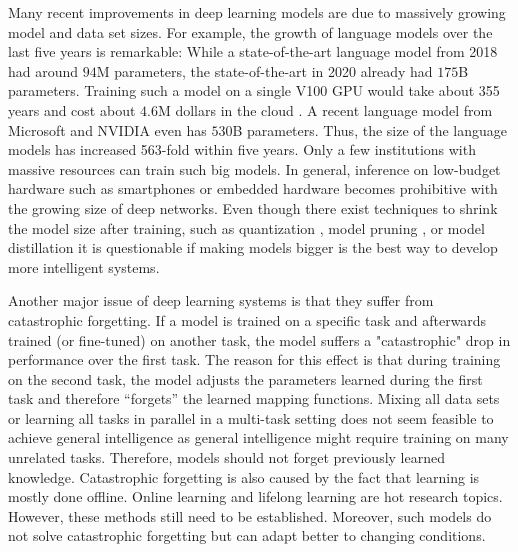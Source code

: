 Many recent improvements in deep learning models are due to massively growing model and data set sizes.
For example, the growth of language models over the last five years is remarkable:
While a state-of-the-art language model from 2018  had around \(94\)M parameters, the state-of-the-art in 2020  already had \(175\)B parameters. Training such a model on a single V100 GPU would take about 355 years and cost about \(4.6\)M dollars in the cloud .
A recent language model from Microsoft and NVIDIA  even has \(530\)B parameters.
Thus, the size of the language models has increased 563-fold within five years.
Only a few institutions with massive resources can train such big models.
In general, inference on low-budget hardware such as smartphones or embedded hardware becomes prohibitive with the growing size of deep networks.
Even though there exist techniques to shrink the model size after training, such as quantization \cite{Wu_Judd_Zhang_Isaev_Micikevicius_2020}, model pruning \cite{Choudhary_Mishra_Goswami_Sarangapani_2020}, or model distillation \cite{Hinton_Vinyals_Dean_2015} it is questionable if making models bigger is the best way to develop more intelligent systems.

Another major issue of deep learning systems is that they suffer from catastrophic forgetting.
If a model is trained on a specific task and afterwards trained (or fine-tuned) on another task, the model suffers a "catastrophic" drop in performance over the first task.
The reason for this effect is that during training on the second task, the model adjusts the parameters learned during the first task and therefore ``forgets'' the learned mapping functions.
Mixing all data sets or learning all tasks in parallel in a multi-task setting \cite{Zhang_Yang_2021} does not seem feasible to achieve general intelligence as general intelligence might require training on many unrelated tasks. Therefore, models should not forget previously learned knowledge.
Catastrophic forgetting is also caused by the fact that learning is mostly done offline.
Online learning \cite{Sahoo_Pham_Lu_Hoi_2017} and lifelong learning \cite{Parisi_Kemker_Part_Kanan_Wermter_2019} are hot research topics.
However, these methods still need to be established. Moreover, such models do not solve catastrophic forgetting but can adapt better to changing conditions.

